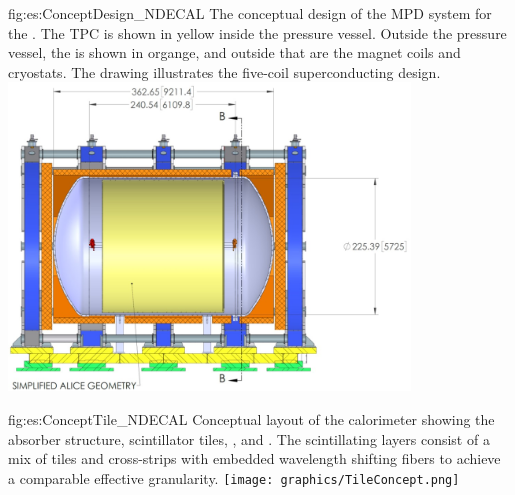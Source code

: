\begin{dunefigure}{fig:es:ConceptDesign_NDECAL}
{The conceptual design of the MPD system for the . The TPC is shown in yellow inside the pressure vessel.  Outside the pressure vessel, the  is shown in organge, and outside that are the magnet coils and cryostats.  The drawing illustrates the five-coil superconducting design.}
\includegraphics[width=0.8\textwidth]{graphics/MPDdrawing.jpg}
\end{dunefigure}

\begin{dunefigure}{fig:es:ConceptTile_NDECAL}
{Conceptual layout of the calorimeter showing the absorber structure, scintillator tiles, , and . The scintillating layers consist of a mix of tiles and cross-strips with embedded wavelength shifting fibers to achieve a comparable effective granularity.}
\texttt{[image: graphics/TileConcept.png]}
\end{dunefigure}

